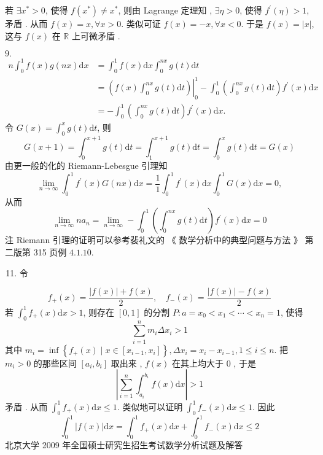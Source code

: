 \documentclass[10pt]{article}
\begin{document}
 若  $\exists x^{*}>0$,  使得  $f\left(x^{*}\right) \neq x^{*}$,  则由  Lagrange  定理知 , $\exists \eta>0$,  使得  $f^{\prime}(\eta)>1$,  矛盾 .  从而  $f(x)=x, \forall x>0$.  类似可证  $f(x)=-x, \forall x<0$.  于是  $f(x)=|x|$,  这与  $f(x)$  在  $\mathbb{R}$  上可微矛盾 .

$9 .$
$$
\begin{aligned}
n \int_{0}^{1} f(x) g(n x) \mathrm{d} x &=\int_{0}^{1} f(x) \mathrm{d} x \int_{0}^{n x} g(t) \mathrm{d} t \\
&=\left.\left(f(x) \int_{0}^{n x} g(t) \mathrm{d} t\right)\right|_{0} ^{1}-\int_{0}^{1}\left(\int_{0}^{n x} g(t) \mathrm{d} t\right) f^{\prime}(x) \mathrm{d} x \\
&=-\int_{0}^{1}\left(\int_{0}^{n x} g(t) \mathrm{d} t\right) f^{\prime}(x) \mathrm{d} x .
\end{aligned}
$$
 令  $G(x)=\int_{0}^{x} g(t) \mathrm{d} t$,  则 
$$
G(x+1)=\int_{0}^{x+1} g(t) \mathrm{d} t=\int_{1}^{x+1} g(t) \mathrm{d} t=\int_{0}^{x} g(t) \mathrm{d} t=G(x)
$$
 由更一般的化的  Riemann-Lebesgue  引理知 
$$
\lim _{n \rightarrow \infty} \int_{0}^{1} f^{\prime}(x) G(n x) \mathrm{d} x=\frac{1}{1} \int_{0}^{1} f^{\prime}(x) \mathrm{d} x \int_{0}^{1} G(x) \mathrm{d} x=0,
$$
 从而 
$$
\lim _{n \rightarrow \infty} n a_{n}=\lim _{n \rightarrow \infty}-\int_{0}^{1}\left(\int_{0}^{n x} g(t) \mathrm{d} t\right) f^{\prime}(x) \mathrm{d} x=0
$$
 注  Riemann  引理的证明可以参考裴礼文的 《 数学分析中的典型问题与方法 》 第二版第  315  页例  $4.1 .10$.

\begin{enumerate}
  \setcounter{enumi}{10}
  \item  令 
\end{enumerate}
$$
f_{+}(x)=\frac{|f(x)|+f(x)}{2}, \quad f_{-}(x)=\frac{|f(x)|-f(x)}{2}
$$
 若  $\int_{0}^{1} f_{+}(x) \mathrm{d} x>1$,  则存在  $[0,1]$  的分割  $P: a=x_{0}<x_{1}<\cdots<x_{n}=1$,  使得 
$$
\sum_{i=1}^{n} m_{i} \Delta x_{i}>1
$$
 其中  $m_{i}=\inf \left\{f_{+}(x) \mid x \in\left[x_{i-1}, x_{i}\right]\right\}, \Delta x_{i}=x_{i}-x_{i-1}, 1 \leqslant i \leqslant n$.  把  $m_{i}>0$  的那些区间  $\left[a_{i}, b_{i}\right]$  取出来 , $f(x)$  在其上均大于  0 ,  于是 
$$
\left|\sum_{i=1}^{n} \int_{a_{i}}^{b_{i}} f(x) \mathrm{d} x\right|>1
$$
 矛盾 .  从而  $\int_{0}^{1} f_{+}(x) \mathrm{d} x \leqslant 1$.  类似地可以证明  $\int_{0}^{1} f_{-}(x) \mathrm{d} x \leqslant 1$.  因此 
$$
\int_{0}^{1}|f(x)| \mathrm{d} x=\int_{0}^{1} f_{+}(x) \mathrm{d} x+\int_{0}^{1} f_{-}(x) \mathrm{d} x \leqslant 2
$$
 北京大学  2009  年全国硕士研究生招生考试数学分析试题及解答 
\end{document}
